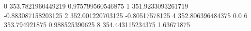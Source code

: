 0 353.7821960449219 0.975799560546875
1 351.9233093261719 -0.883087158203125
2 352.001220703125 -0.80517578125
4 352.806396484375 0.0
6 353.794921875 0.988525390625
8 354.443115234375 1.63671875
